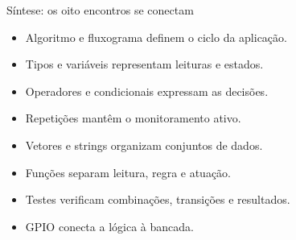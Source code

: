 \begin{frame}[t]{Síntese: os oito encontros se conectam}
\begin{itemize}
\item Algoritmo e fluxograma definem o ciclo da aplicação.
\item Tipos e variáveis representam leituras e estados.
\item Operadores e condicionais expressam as decisões.
\item Repetições mantêm o monitoramento ativo.
\item Vetores e strings organizam conjuntos de dados.
\item Funções separam leitura, regra e atuação.
\item Testes verificam combinações, transições e resultados.
\item GPIO conecta a lógica à bancada.
\end{itemize}
\end{frame}

